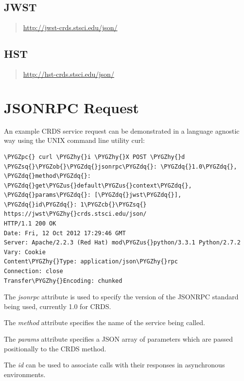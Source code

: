 \documentclass[letterpaper,10pt,english]{sphinxmanual}
\def\PYGZus{\char`\_}
\def\PYGZob{\char`\{}
\def\PYGZcb{\char`\}}
\def\PYGZpc{\char`\%}
\def\PYGZhy{\char`\-}
\def\PYGZsq{\char`\'}
\def\PYGZdq{\char`\"}
\renewcommand\PYGZsq{\textquotesingle}
\begin{document}
\subsection{JWST}
\label{web_services:jwst}\begin{quote}

\href{http://jwst-crds.stsci.edu/json/}{http://jwst-crds.stsci.edu/json/}
\end{quote}


\subsection{HST}
\label{web_services:hst}\begin{quote}

\href{http://hst-crds.stsci.edu/json/}{http://hst-crds.stsci.edu/json/}
\end{quote}


\section{JSONRPC Request}
\label{web_services:jsonrpc-request}
An example CRDS service request can be demonstrated in a language agnostic way
using the UNIX command line utility curl:

\begin{Verbatim}[commandchars=\\\{\}]
\PYGZpc{} curl \PYGZhy{}i \PYGZhy{}X POST \PYGZhy{}d \PYGZsq{}\PYGZob{}\PYGZdq{}jsonrpc\PYGZdq{}: \PYGZdq{}1.0\PYGZdq{}, \PYGZdq{}method\PYGZdq{}: \PYGZdq{}get\PYGZus{}default\PYGZus{}context\PYGZdq{}, \PYGZdq{}params\PYGZdq{}: [\PYGZdq{}jwst\PYGZdq{}], \PYGZdq{}id\PYGZdq{}: 1\PYGZcb{}\PYGZsq{} https://jwst\PYGZhy{}crds.stsci.edu/json/
HTTP/1.1 200 OK
Date: Fri, 12 Oct 2012 17:29:46 GMT
Server: Apache/2.2.3 (Red Hat) mod\PYGZus{}python/3.3.1 Python/2.7.2
Vary: Cookie
Content\PYGZhy{}Type: application/json\PYGZhy{}rpc
Connection: close
Transfer\PYGZhy{}Encoding: chunked
\end{Verbatim}

The \emph{jsonrpc} attribute is used to specify the version of the JSONRPC standard
being used,  currently 1.0 for CRDS.

The \emph{method} attribute specifies the name of the service being called.

The \emph{params} attribute specifies a JSON array of parameters which are passed
positionally to the CRDS method.

The \emph{id} can be used to associate calls with their responses in asynchronous
environments.
\end{document}

